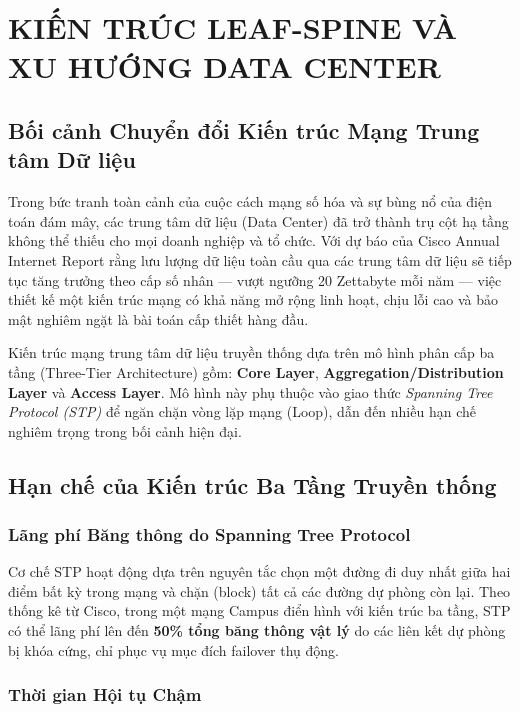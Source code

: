 \section{KIẾN TRÚC LEAF-SPINE VÀ XU HƯỚNG DATA CENTER}\label{sec:kien_truc_leaf_spine}

\subsection{Bối cảnh Chuyển đổi Kiến trúc Mạng Trung tâm Dữ liệu}

Trong bức tranh toàn cảnh của cuộc cách mạng số hóa và sự bùng nổ của điện toán đám mây, các trung tâm dữ liệu (Data Center) đã trở thành trụ cột hạ tầng không thể thiếu cho mọi doanh nghiệp và tổ chức. Với dự báo của Cisco Annual Internet Report rằng lưu lượng dữ liệu toàn cầu qua các trung tâm dữ liệu sẽ tiếp tục tăng trưởng theo cấp số nhân — vượt ngưỡng 20 Zettabyte mỗi năm — việc thiết kế một kiến trúc mạng có khả năng mở rộng linh hoạt, chịu lỗi cao và bảo mật nghiêm ngặt là bài toán cấp thiết hàng đầu.

Kiến trúc mạng trung tâm dữ liệu truyền thống dựa trên mô hình phân cấp ba tầng (Three-Tier Architecture) gồm: \textbf{Core Layer}, \textbf{Aggregation/Distribution Layer} và \textbf{Access Layer}. Mô hình này phụ thuộc vào giao thức \textit{Spanning Tree Protocol (STP)} để ngăn chặn vòng lặp mạng (Loop), dẫn đến nhiều hạn chế nghiêm trọng trong bối cảnh hiện đại.

\subsection{Hạn chế của Kiến trúc Ba Tầng Truyền thống}

\subsubsection{Lãng phí Băng thông do Spanning Tree Protocol}

Cơ chế STP hoạt động dựa trên nguyên tắc chọn một đường đi duy nhất giữa hai điểm bất kỳ trong mạng và chặn (block) tất cả các đường dự phòng còn lại. Theo thống kê từ Cisco, trong một mạng Campus điển hình với kiến trúc ba tầng, STP có thể lãng phí lên đến \textbf{50\% tổng băng thông vật lý} do các liên kết dự phòng bị khóa cứng, chỉ phục vụ mục đích failover thụ động.

\subsubsection{Thời gian Hội tụ Chậm}

